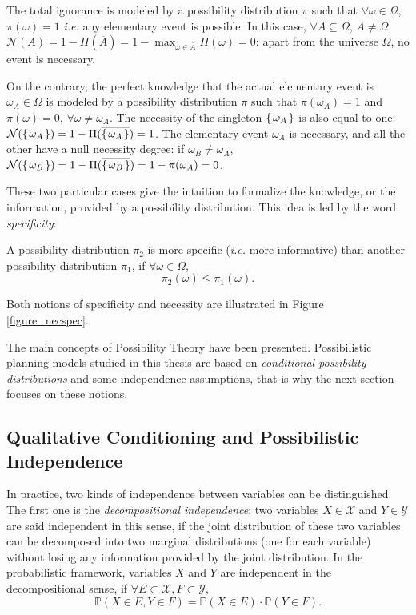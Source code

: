 The total ignorance is modeled by a possibility distribution $\pi$ such that $\forall \omega \in \Omega$,
$\pi(\omega)=1$ \textit{i.e.} any elementary event is possible.
In this case, $\forall A \subseteq \Omega$, $A \neq \Omega$, 
$\mathcal{N}(A)=1-\Pi(\overline{A})=1-\max_{\omega \in \overline{A}} \Pi(\omega)=0$:
apart from the universe $\Omega$,
no event is necessary. 

On the contrary, the perfect knowledge that the actual elementary event is $\omega_A \in \Omega$
is modeled by a possibility distribution $\pi$ such that $\pi(\omega_A) = 1$
and $\pi(\omega)=0$, $\forall \omega \neq \omega_A$. The necessity of the singleton $\left\{ \left. \omega_A \right. \right\}$
is also equal to one: $\mathcal{N}(\left\{ \left. \omega_A \right. \right\})=1-\Pi(\overline{\left\{ \left. \omega_A  \right. \right\}}) = 1$. 
The elementary event $\omega_A$ is necessary, and all the other have a null necessity degree:
if $\omega_B \neq \omega_A$, $\mathcal{N}(\left\{ \left. \omega_B \right. \right\})=1-\Pi(\overline{\left\{ \left. \omega_B  \right. \right\}}) = 1 - \pi(\omega_A) = 0$.

These two particular cases give the intuition to formalize the knowledge, 
or the information, provided by a possibility distribution.
This idea is led by the word \textit{specificity}:
\begin{Def}[Specificity]
\label{def_specificity}
A possibility distribution $\pi_2$ is more specific (\textit{i.e.} more informative) than another possibility distribution $\pi_1$, if $\forall \omega \in \Omega$,
\[ \pi_2(\omega) \leqslant \pi_1(\omega).\]
\end{Def}
Both notions of specificity and necessity are illustrated
in Figure \ref{figure_necspec}.

The main concepts of Possibility Theory have been presented.
Possibilistic planning models studied in this thesis 
are based on \textit{conditional possibility distributions}	 
and some independence assumptions, that is why
the next section focuses on these notions.

\subsection{Qualitative Conditioning and Possibilistic Independence}
\label{qualitative_indep}
In practice, two kinds of independence between variables can be distinguished. 
The first one is the \textit{decompositional independence}:
two variables $X \in \mathcal{X}$ and $Y \in \mathcal{Y}$ 
are said independent in this sense,
if the joint distribution of these two variables
can be decomposed into two marginal distributions
(one for each variable)
without losing any information
provided by the joint distribution. 
In the probabilistic framework,
variables $X$
and $Y$ are independent 
in the decompositional sense, if $\forall E \subset \mathcal{X}, F \subset \mathcal{Y}$,
\begin{equation}
\label{decompositional_indep}
\mathbb{P}(X \in E, Y \in F) = \mathbb{P}(X \in E) \cdot \mathbb{P}(Y \in F).
\end{equation}

